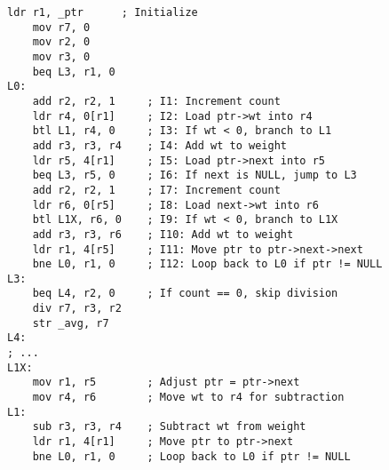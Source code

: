 \begin{lstlisting}[style=AsmStyle]
    ldr r1, _ptr      ; Initialize
    mov r7, 0         
    mov r2, 0         
    mov r3, 0         
    beq L3, r1, 0     
L0:
    add r2, r2, 1     ; I1: Increment count
    ldr r4, 0[r1]     ; I2: Load ptr->wt into r4
    btl L1, r4, 0     ; I3: If wt < 0, branch to L1
    add r3, r3, r4    ; I4: Add wt to weight
    ldr r5, 4[r1]     ; I5: Load ptr->next into r5
    beq L3, r5, 0     ; I6: If next is NULL, jump to L3
    add r2, r2, 1     ; I7: Increment count
    ldr r6, 0[r5]     ; I8: Load next->wt into r6
    btl L1X, r6, 0    ; I9: If wt < 0, branch to L1X
    add r3, r3, r6    ; I10: Add wt to weight
    ldr r1, 4[r5]     ; I11: Move ptr to ptr->next->next
    bne L0, r1, 0     ; I12: Loop back to L0 if ptr != NULL
L3:
    beq L4, r2, 0     ; If count == 0, skip division
    div r7, r3, r2    
    str _avg, r7      
L4:
; ...
L1X:
    mov r1, r5        ; Adjust ptr = ptr->next
    mov r4, r6        ; Move wt to r4 for subtraction
L1: 
    sub r3, r3, r4    ; Subtract wt from weight
    ldr r1, 4[r1]     ; Move ptr to ptr->next
    bne L0, r1, 0     ; Loop back to L0 if ptr != NULL
\end{lstlisting}
